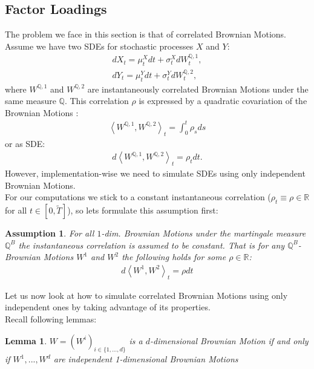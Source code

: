 \documentclass[12pt]{article}
\newtheorem{assumption}{Assumption}[section]
\newtheorem{lemma}[theorem]{Lemma}
\begin{document}
	\subsection{Factor Loadings}\label{sec::FactorLoading}
	The problem we face in this section is that of correlated Brownian Motions. \\
	Assume we have two SDEs for stochastic processes $X$ and $Y$:	
	\begin{align*}
		dX_t = \mu^X_t dt + \sigma^X_t dW^{\mathbb{Q}, 1}_t,\\
		dY_t = \mu^Y_t dt + \sigma^Y_t dW^{\mathbb{Q}, 2}_t,
	\end{align*}
	where $W^{\mathbb{Q}, 1}$ and $W^{\mathbb{Q}, 2}$ are instantaneously correlated Brownian Motions under the same measure $\mathbb{Q}$. This correlation $\rho$ is expressed by a quadratic covariation of the Brownian Motions \cite{FriesBook}:
	\begin{align*}
		\left\langle W^{\mathbb{Q}, 1}, W^{\mathbb{Q}, 2} \right\rangle_t = \int_{0}^{t}\rho_s ds
	\end{align*}
	or as SDE:
	\begin{align*}
		d\left\langle W^{\mathbb{Q}, 1}, W^{\mathbb{Q}, 2} \right\rangle_t = \rho_t dt.
	\end{align*}
	However, implementation-wise we need to simulate SDEs using only independent Brownian Motions.\\
	For our computations we stick to a constant instantaneous correlation ($\rho_t \equiv \rho\in \mathbb{R}$ for all $t \in \left[0,\tilde{T}\right]$), so lets formulate this assumption first:
	\begin{assumption}
		For all $1$-dim. Brownian Motions under the martingale measure $\mathbb{Q}^B$ the instantaneous correlation is assumed to be constant. That is for any $\mathbb{Q}^B$-Brownian Motions $W^1$ and $W^2$ the following holds for some $\rho \in \mathbb{R}$:
		\begin{align*}
			d\left\langle W^{1}, W^{2} \right\rangle_t = \rho dt
		\end{align*}
	\end{assumption}
	Let us now look at how to simulate correlated Brownian Motions using only independent ones by taking advantage of its properties.\\
	Recall following lemmas:
	\begin{lemma}
		$W = (W^i)_{i\in\{1, ..., d\}}$ is a $d$-dimensional Brownian Motion if and only if $W^1, ..., W^d$ are independent 1-dimensional Brownian Motions
	\end{lemma}
\end{document}
